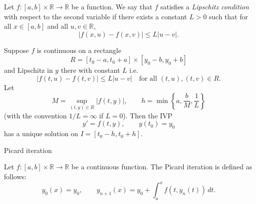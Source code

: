 \documentclass[12pt, a4paper]{article}
\begin{document}
\vspace{10pt}

\begin{definition}
    Let $f: [a,b] \times \mathbb{R} \to \mathbb{R}$ be a function. We say that $f$ satisfies a \textit{Lipschitz condition} with respect to the second variable if there exists a constant $L > 0$ such that for all $x \in [a,b]$ and all $u, v \in \mathbb{R}$,
    \[
        |f(x, u) - f(x, v)| \leq L |u - v|.
    \]
\end{definition}

\clearpage

\begin{theorem}
Suppose $f$ is continuous on a rectangle
\[
R = [t_0-a, t_0+a] \times [y_0-b, y_0+b]
\]
and Lipschitz in $y$ there with constant $L$ i.e. 
\[
|f(t, u) - f(t, v)| \leq L |u - v| \quad \text{for all } (t,u), (t,v) \in R.
\]
Let
\[
M = \sup_{(t,y)\in R} |f(t,y)|,
\qquad
h = \min\left\{a,\frac{b}{M},\frac{1}{L}\right\}
\]
(with the convention $1/L=\infty$ if $L=0$). Then the IVP
\[
y' = f(t,y), \qquad y(t_0)=y_0
\]
has a unique solution on $I = [t_0-h, t_0+h]$.
\end{theorem}

\clearpage

\begin{heading}
    Picard iteration
\end{heading}

\vspace{10pt}

\begin{definition}
    Let $f: [a,b] \times \mathbb{R} \to \mathbb{R}$ be a continuous function. The Picard iteration is defined as follows:
    \[
        y_0(x) = y_0, \qquad y_{n+1}(x) = y_0 + \int_a^x f(t, y_n(t))\, dt.
    \]
    
\end{definition}

\clearpage





\EndPage
\end{document}
